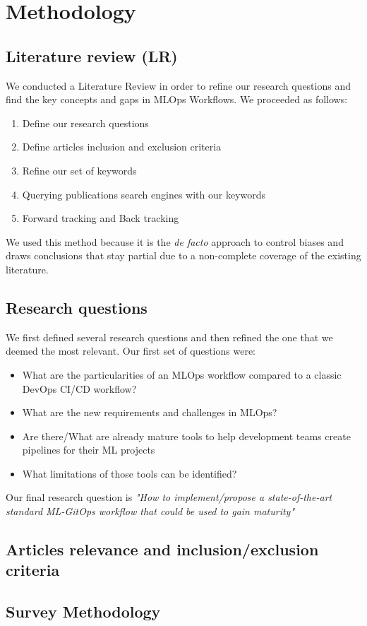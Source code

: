 \section{Methodology}\label{sec:methodo}
\subsection{Literature review (LR)}\label{subsec:literature-review-(lr)}

We conducted a Literature Review in order to refine our research questions and find the key concepts and gaps in MLOps Workflows.
We proceeded as follows:

\begin{enumerate}
    \item Define our research questions
    \item Define articles inclusion and exclusion criteria
    \item Refine our set of keywords
    \item Querying publications search engines with our keywords
    \item Forward tracking and Back tracking
\end{enumerate}

We used this method because it is the \textit{de facto} approach to control biases and draws conclusions that stay partial due to
a non-complete coverage of the existing literature.

\subsection{Research questions}\label{subsec:research-questions}

We first defined several research questions and then refined the one that we deemed the most relevant.
Our first set of questions were:
\begin{itemize}
    \item What are the particularities of an MLOps workflow compared to a classic DevOps CI/CD workflow?
    \item What are the new requirements and challenges in MLOps?
    \item Are there/What are already mature tools to help development teams create pipelines for their ML projects
    \item What limitations of those tools can be identified?
\end{itemize}

Our final research question is
\textit{"How to implement/propose a state-of-the-art standard ML-GitOps workflow that could be used to gain maturity"\cite{mlops-definition-tools-and-challenge,mlops-maturity-model}}

\subsection{Articles relevance and inclusion/exclusion criteria}\label{subsec:articles-relevance-and-inclusion/exclusion-criteria}

\subsection{Survey Methodology}\label{subsec:survey-methodology}
